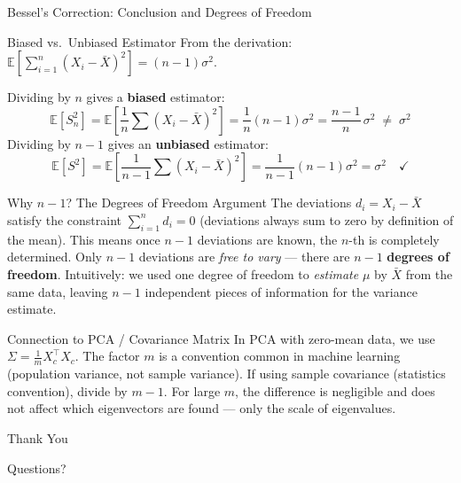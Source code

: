 \documentclass{beamer}
\begin{document}
\begin{frame}[shrink=10]{Bessel's Correction: Conclusion and Degrees of Freedom}
  \begin{block}{Biased vs.\ Unbiased Estimator}
    From the derivation: $\mathbb{E}\!\left[\sum_{i=1}^n(X_i-\bar{X})^2\right] = (n-1)\sigma^2$.

    \medskip

    Dividing by $n$ gives a \textbf{biased} estimator:
    \[
      \mathbb{E}[S_n^2]
        = \mathbb{E}\!\left[\frac{1}{n}\sum(X_i-\bar{X})^2\right]
        = \frac{1}{n}(n-1)\sigma^2
        = \frac{n-1}{n}\,\sigma^2 \;\neq\; \sigma^2
    \]
    Dividing by $n-1$ gives an \textbf{unbiased} estimator:
    \[
      \mathbb{E}[S^2]
        = \mathbb{E}\!\left[\frac{1}{n-1}\sum(X_i-\bar{X})^2\right]
        = \frac{1}{n-1}(n-1)\sigma^2
        = \sigma^2
      \quad\checkmark
    \]
  \end{block}

  \begin{block}{Why $n-1$? The Degrees of Freedom Argument}
    The deviations $d_i = X_i - \bar{X}$ satisfy the constraint
    $\sum_{i=1}^n d_i = 0$ (deviations always sum to zero by definition
    of the mean).
    This means once $n-1$ deviations are known, the $n$-th is completely
    determined.
    Only $n-1$ deviations are \emph{free to vary} --- there are
    $n-1$ \textbf{degrees of freedom}.
    Intuitively: we used one degree of freedom to \emph{estimate} $\mu$
    by $\bar{X}$ from the same data, leaving $n-1$ independent pieces
    of information for the variance estimate.
  \end{block}

  \begin{alertblock}{Connection to PCA / Covariance Matrix}
    In PCA with zero-mean data, we use $\Sigma = \frac{1}{m}X_c^\top X_c$.
    The factor $m$ is a convention common in machine learning
    (population variance, not sample variance).
    If using sample covariance (statistics convention), divide by $m-1$.
    For large $m$, the difference is negligible and does not affect which
    eigenvectors are found --- only the scale of eigenvalues.
  \end{alertblock}
\end{frame}

\begin{frame}
  \Huge{\centerline{Thank You}}
  \vspace{0.6cm}
  \large{\centerline{Questions?}}
\end{frame}
\end{document}
